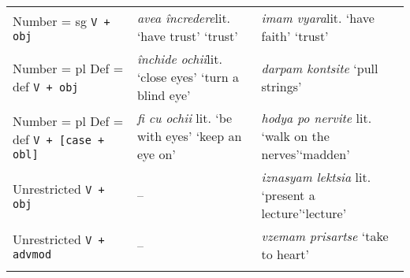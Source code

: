 \documentclass[output=paper,colorlinks,citecolor=brown]{langscibook}
\begin{document}
\begin{table}
\begin{tabularx}{\textwidth}{QQQ}
Number = sg  \newline \texttt{V + obj}
& \textit{avea încredere}\newline lit. `have trust' \newline `trust'
& \textit{imam vyara}\newline lit. `have faith' \newline `trust' \\
\addlinespace
Number = pl \newline Def = def \newline \texttt{V + obj}
& \textit{închide ochii}\newline lit. `close eyes' \newline `turn a blind eye' 
& \textit{darpam kontsite}%
\newline `pull strings' \\
\addlinespace
Number = pl \newline Def = def \newline \texttt{V + [case + obl]}
& \textit{fi cu ochii} \newline lit. `be with eyes' \newline `keep an eye on' %
& \textit{hodya po nervite}%
\newline  lit. `walk on the nerves'\newline `madden' \\
\addlinespace
Unrestricted \newline \texttt{V + obj}
& --  
& \textit{iznasyam lektsia} \newline  lit. `present a lecture'\newline `lecture' \\
\addlinespace
Unrestricted \newline \texttt{V + advmod}
& --  
& \textit{vzemam prisartse} \newline `take to heart' \\
\addlinespace

\end{tabularx}
\end{table}
\end{document}
